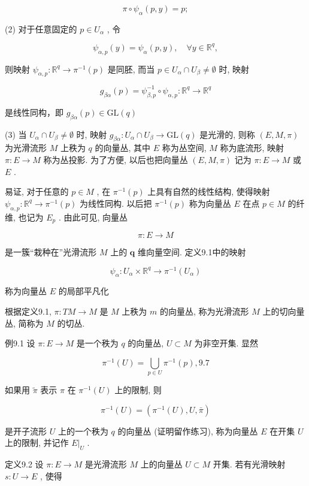 $$
\pi \circ \psi_ {\alpha} (p, y) = p;
$$

(2) 对于任意固定的  $p \in U_{\alpha}$ , 令

$$
\psi_ {\alpha , p} (y) = \psi_ {\alpha} (p, y), \quad \forall y \in \mathbb {R} ^ {q},
$$

则映射  $\psi_{\alpha ,p}:\mathbb{R}^q\to \pi^{-1}(p)$  是同胚, 而当  $p\in U_{\alpha}\cap U_{\beta}\neq \emptyset$  时, 映射

$$
g _ {\beta \alpha} (p) = \psi_ {\beta , p} ^ {- 1} \circ \psi_ {\alpha , p}: \mathbb {R} ^ {q} \rightarrow \mathbb {R} ^ {q}
$$

是线性同构，即  $g_{\beta \alpha}(p)\in \mathrm{GL}(q)$

(3) 当  $U_{\alpha} \cap U_{\beta} \neq \emptyset$  时, 映射  $g_{\beta \alpha}: U_{\alpha} \cap U_{\beta} \to \mathrm{GL}(q)$  是光滑的, 则称  $(E, M, \pi)$  为光滑流形  $M$  上秩为  $q$  的向量丛, 其中  $E$  称为丛空间,  $M$  称为底流形, 映射  $\pi: E \to M$  称为丛投影. 为了方便, 以后也把向量丛  $(E, M, \pi)$  记为  $\pi: E \to M$  或  $E$ .

易证, 对于任意的  $p \in M$ , 在  $\pi^{-1}(p)$  上具有自然的线性结构, 使得映射  $\psi_{\alpha, p}: \mathbb{R}^q \to \pi^{-1}(p)$  为线性同构. 以后把  $\pi^{-1}(p)$  称为向量丛  $E$  在点  $p \in M$  的纤维, 也记为  $E_p$ . 由此可见, 向量丛

$$
\pi : E \rightarrow M
$$

是一簇“栽种在”光滑流形  $M$  上的  $\pmb{q}$  维向量空间. 定义9.1中的映射

$$
\psi_ {\alpha}: U _ {\alpha} \times \mathbb {R} ^ {q} \rightarrow \pi^ {- 1} (U _ {\alpha})
$$

称为向量丛  $E$  的局部平凡化

根据定义9.1,  $\pi : TM \to M$  是  $M$  上秩为  $m$  的向量丛, 称为光滑流形  $M$  上的切向量丛, 简称为  $M$  的切丛.

例9.1 设  $\pi : E \to M$  是一个秩为  $q$  的向量丛,  $U \subset M$  为非空开集. 显然

$$
\pi^ {- 1} (U) = \bigcup_ {p \in U} \pi^ {- 1} (p),  {9.7}
$$

如果用  $\tilde{\pi}$  表示  $\pi$  在  $\pi^{-1}(U)$  上的限制, 则

$$
\pi^ {- 1} (U) = (\pi^ {- 1} (U), U, \bar {\pi})
$$

是开子流形  $U$  上的一个秩为  $q$  的向量丛 (证明留作练习), 称为向量丛  $E$  在开集  $U$  上的限制, 并记作  $E|_{U}$ .

定义9.2 设  $\pi: E \to M$  是光滑流形  $M$  上的向量丛  $U \subset M$  开集. 若有光滑映射  $s: U \to E$ , 使得

